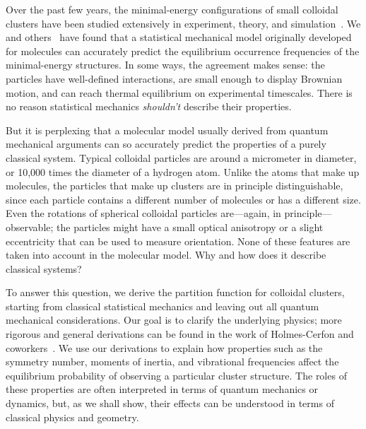 \documentclass[pre, aps, twocolumn, reprint, amsmath,amssymb, showpacs,
superscriptaddress] {revtex4-1}
\begin{document}
Over the past few years, the minimal-energy configurations of small
colloidal clusters have been studied extensively in experiment, theory,
and simulation~\cite{malins_geometric_2009, arkus09, meng10, wales10,
  hoy_minimal_2010, arkus_deriving_2011, hoy12, perry12, calvo12,
  morgan14, perry_two-dimensional_2015, hoy15,
  holmes-cerfon_enumerating_2016, kallus_free_2017,
  holmes-cerfon_sticky-sphere_2017}. We and others~\cite{meng10,
  wales10, morgan14, perry_two-dimensional_2015} have found that a
statistical mechanical model originally developed for molecules can
accurately predict the equilibrium occurrence frequencies of the
minimal-energy structures. In some ways, the agreement makes sense: the
particles have well-defined interactions, are small enough to display
Brownian motion, and can reach thermal equilibrium on experimental
timescales. There is no reason statistical mechanics \emph{shouldn't}
describe their properties.

But it is perplexing that a molecular model usually derived from quantum
mechanical arguments can so accurately predict the properties of a
purely classical system. Typical colloidal particles are around a
micrometer in diameter, or 10,000 times the diameter of a hydrogen atom.
Unlike the atoms that make up molecules, the particles that make up
clusters are in principle distinguishable, since each particle contains
a different number of molecules or has a different size. Even the
rotations of spherical colloidal particles are---again, in
principle---observable; the particles might have a small optical
anisotropy or a slight eccentricity that can be used to measure
orientation. None of these features are taken into account in the
molecular model. Why and how does it describe classical systems?

To answer this question, we derive the partition function for colloidal
clusters, starting from classical statistical mechanics and leaving out
all quantum mechanical considerations. Our goal is to clarify the
underlying physics; more rigorous and general derivations can be found
in the work of Holmes-Cerfon and
coworkers~\cite{holmes-cerfon_enumerating_2016,
  holmes-cerfon_sticky-sphere_2017, kallus_free_2017}. We use our
derivations to explain how properties such as the symmetry number,
moments of inertia, and vibrational frequencies affect the equilibrium
probability of observing a particular cluster structure. The roles of
these properties are often interpreted in terms of quantum mechanics or
dynamics, but, as we shall show, their effects can be understood in
terms of classical physics and geometry.
\end{document}
